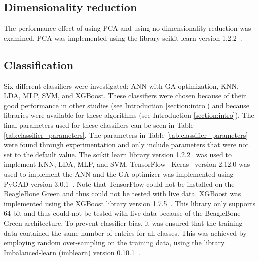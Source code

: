 \subsection{Dimensionality reduction}
The performance effect of using PCA and using no dimensionality reduction was examined.
PCA was implemented using the library scikit learn version 1.2.2~\cite{scikit-learn}.

\subsection{Classification}
Six different classifiers were investigated: ANN with GA optimization, KNN, LDA, MLP, SVM, and XGBoost. These classifiers were chosen because of their good performance in other studies (see Introduction \ref{section:intro}) and because libraries were available for these algorithms (see Introduction \ref{section:intro}). The final parameters used for these classifiers can be seen in Table \ref{tab:classifier_parameters}. The parameters in Table \ref{tab:classifier_parameters} were found through experimentation and only include parameters that were not set to the default value.
The scikit learn library version 1.2.2~\cite{scikit-learn} was used to implement KNN, LDA, MLP, and SVM. 
TensorFlow~\cite{tensorflow2015-whitepaper} Keras~\cite{chollet2015keras} version 2.12.0 was used to implement the ANN and the GA optimizer was implemented using PyGAD version 3.0.1~\cite{gadPyGADIntuitiveGenetic2021}. Note that TensorFlow could not be installed on the BeagleBone Green and thus could not be tested with live data. %
XGBoost was implemented using the XGBoost library version 1.7.5~\cite{Chen:2016:XST:2939672.2939785}. This library only supports 64-bit and thus could not be tested with live data because of the BeagleBone Green architecture. %
To prevent classifier bias, it was ensured that the training data contained the same number of entries for all classes. This was achieved by employing random over-sampling on the training data, using the library Imbalanced-learn (imblearn) version 0.10.1~\cite{JMLR:v18:16-365}.

